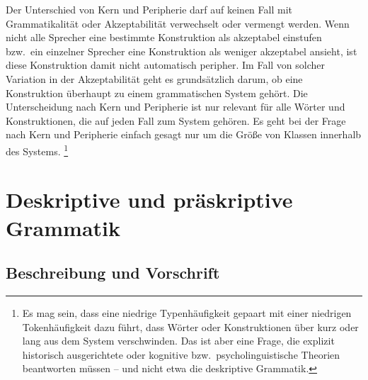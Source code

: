 

Der Unterschied von Kern und Peripherie darf auf keinen Fall mit Grammatikalität oder Akzeptabilität verwechselt oder vermengt werden.
Wenn nicht alle Sprecher eine bestimmte Konstruktion als akzeptabel einstufen bzw.\ ein einzelner Sprecher eine Konstruktion als weniger akzeptabel ansieht, ist diese Konstruktion damit nicht automatisch peripher.
Im Fall von solcher Variation in der Akzeptabilität geht es grundsätzlich darum, ob eine Konstruktion überhaupt zu einem grammatischen System gehört.
Die Unterscheidung nach Kern und Peripherie ist nur relevant für alle Wörter und Konstruktionen, die auf jeden Fall zum System gehören.
Es geht bei der Frage nach Kern und Peripherie einfach gesagt nur um die Größe von Klassen innerhalb des Systems.%
\footnote{Es mag sein, dass eine niedrige Typenhäufigkeit gepaart mit einer niedrigen Tokenhäufigkeit dazu führt, dass Wörter oder Konstruktionen über kurz oder lang aus dem System verschwinden.
Das ist aber eine Frage, die explizit historisch ausgerichtete oder kognitive bzw.\ psycholinguistische Theorien beantworten müssen -- und nicht etwa die deskriptive Grammatik.}




\section{Deskriptive und präskriptive Grammatik}

\label{sec:deskriptivenormativegrammatik}

\subsection{Beschreibung und Vorschrift}

